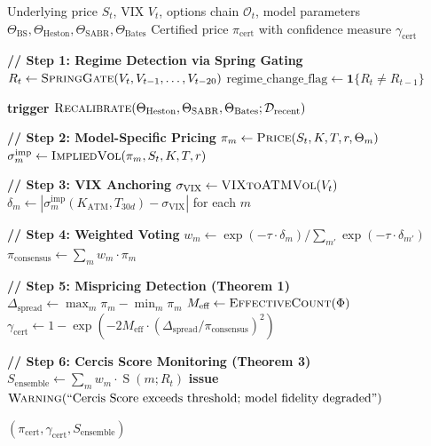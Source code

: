 \documentclass[11pt,a4paper]{article}
\theoremstyle{plain}
\theoremstyle{definition}
\theoremstyle{remark}
\newcommand{\indicator}{\mathbf{1}}
\newcommand{\BS}{\text{BS}}
\newcommand{\Heston}{\text{Heston}}
\newcommand{\SABR}{\text{SABR}}
\newcommand{\BatesM}{\text{Bates}}
\DeclareMathOperator{\CercisScore}{S}
\begin{document}
\begin{algorithm}[H]
\caption{Multi-Model Yajie Consensus Protocol (Daily Cycle)}
\label{alg:yajie}
\begin{algorithmic}[1]
\Require Underlying price $S_t$, VIX $V_t$, options chain $\mathcal{O}_t$, model parameters $\Theta_{\BS}, \Theta_{\Heston}, \Theta_{\SABR}, \Theta_{\BatesM}$
\Ensure Certified price $\pi_{\text{cert}}$ with confidence measure $\gamma_{\text{cert}}$

\State \textbf{// Step 1: Regime Detection via Spring Gating}
\State $R_t \gets \textsc{SpringGate}(V_t, V_{t-1}, \dots, V_{t-20})$
\State $\text{regime\_change\_flag} \gets \indicator\{R_t \neq R_{t-1}\}$

    \State \textbf{trigger} $\textsc{Recalibrate}(\Theta_{\Heston}, \Theta_{\SABR}, \Theta_{\BatesM}; \mathcal{D}_{\text{recent}})$
\EndIf

\State \textbf{// Step 2: Model-Specific Pricing}
\For{$m \in \{\BS, \Heston, \SABR, \BatesM\}$}
    \State $\pi_m \gets \textsc{Price}(S_t, K, T, r, \Theta_m)$
    \State $\sigma_m^{\text{imp}} \gets \textsc{ImpliedVol}(\pi_m, S_t, K, T, r)$
\EndFor

\State \textbf{// Step 3: VIX Anchoring}
\State $\sigma_{\text{VIX}} \gets \textsc{VIXtoATMVol}(V_t)$
\State $\delta_m \gets |\sigma_m^{\text{imp}}(K_{\text{ATM}}, T_{30d}) - \sigma_{\text{VIX}}|$ for each $m$

\State \textbf{// Step 4: Weighted Voting}
\State $w_m \gets \exp(-\tau \cdot \delta_m) / \sum_{m'} \exp(-\tau \cdot \delta_{m'})$
\State $\pi_{\text{consensus}} \gets \sum_m w_m \cdot \pi_m$

\State \textbf{// Step 5: Mispricing Detection (Theorem 1)}
\State $\Delta_{\text{spread}} \gets \max_m \pi_m - \min_m \pi_m$
\State $M_{\text{eff}} \gets \textsc{EffectiveCount}(\Phi)$
\State $\gamma_{\text{cert}} \gets 1 - \exp(-2 M_{\text{eff}} \cdot (\Delta_{\text{spread}} / \pi_{\text{consensus}})^2)$

\State \textbf{// Step 6: Cercis Score Monitoring (Theorem 3)}
\State $S_{\text{ensemble}} \gets \sum_m w_m \cdot \CercisScore(m; R_t)$
    \State \textbf{issue} $\textsc{Warning}(\text{``Cercis Score exceeds threshold; model fidelity degraded''})$
\EndIf

\State \Return $(\pi_{\text{cert}}, \gamma_{\text{cert}}, S_{\text{ensemble}})$
\end{algorithmic}
\end{algorithm}
\end{document}
